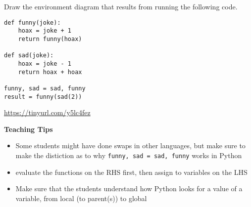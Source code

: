\begin{blocksection}
\question Draw the environment diagram that results from running the following code.

\begin{lstlisting}
def funny(joke):
    hoax = joke + 1
    return funny(hoax)

def sad(joke):
    hoax = joke - 1
    return hoax + hoax

funny, sad = sad, funny
result = funny(sad(2))
\end{lstlisting}

\begin{solution}[2in]
\url{https://tinyurl.com/y5lc4fez}
\end{solution}
\end{blocksection}

\begin{questionmeta}
    \textbf{Teaching Tips}
      \begin{itemize}
        \item Some students might have done swaps in other languages, but make sure to make the distiction as to why \lstinline{funny, sad = sad, funny} works in Python
        \item evaluate the functions on the RHS first, then assign to variables on the LHS
        \item Make sure that the students understand how Python looks for a value of a variable, from local (to parent(s)) to global
      \end{itemize}
    \end{questionmeta}
    